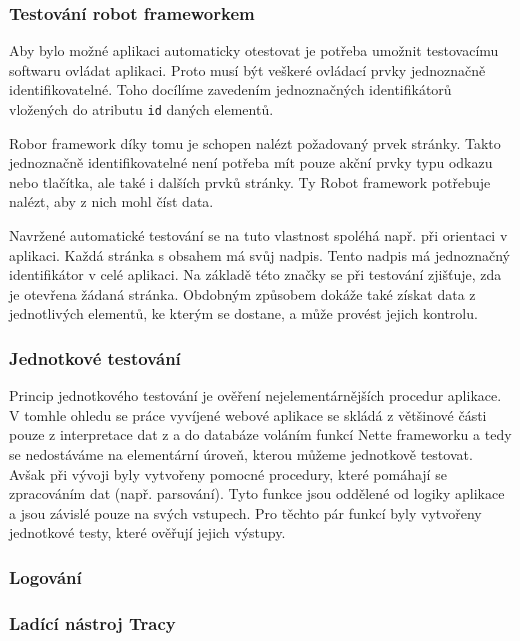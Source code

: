 \documentclass[czech,BP]{thesiskiv}
\begin{document}
		\subsubsection{Testování robot frameworkem}
		\par Aby bylo možné aplikaci automaticky otestovat je potřeba umožnit testovacímu softwaru ovládat aplikaci. Proto musí být veškeré ovládací prvky jednoznačně identifikovatelné. Toho docílíme zavedením jednoznačných identifikátorů vložených do atributu \texttt{id} daných elementů.
		\par Robor framework díky tomu je schopen nalézt požadovaný prvek stránky. Takto jednoznačně identifikovatelné není potřeba mít pouze akční prvky typu odkazu nebo tlačítka, ale také i dalších prvků stránky. Ty Robot framework potřebuje nalézt, aby z nich mohl číst data.
		\par Navržené automatické testování se na tuto vlastnost spoléhá např. při orientaci v aplikaci. Každá stránka s obsahem má svůj nadpis. Tento nadpis má jednoznačný identifikátor v celé aplikaci. Na základě této značky se při testování zjišťuje, zda je otevřena žádaná stránka. Obdobným způsobem dokáže také získat data z jednotlivých elementů, ke kterým se dostane, a může provést jejich kontrolu.
		
		\subsubsection{Jednotkové testování}
		\par Princip jednotkového testování je ověření nejelementárnějších procedur aplikace. V tomhle ohledu se práce vyvíjené webové aplikace se skládá z většinové části pouze z interpretace dat z a do databáze voláním funkcí Nette frameworku a tedy se nedostáváme na elementární úroveň, kterou můžeme jednotkově testovat. Avšak při vývoji byly vytvořeny pomocné procedury, které pomáhají se zpracováním dat (např. parsování). Tyto funkce jsou oddělené od logiky aplikace a jsou závislé pouze na svých vstupech. Pro těchto pár funkcí byly vytvořeny jednotkové testy, které ověřují jejich výstupy.
		
		\subsubsection{Logování}
		
		\subsubsection{Ladící nástroj Tracy}
		
\end{document}
